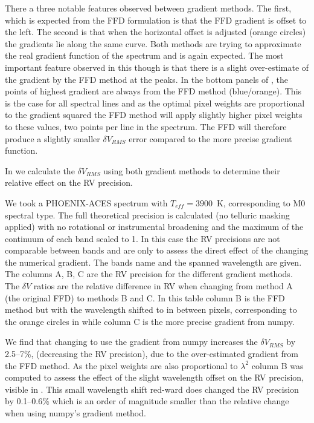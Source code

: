 There a three notable features observed between gradient methods. The first, which is expected from the FFD formulation is that the FFD gradient is offset to the left. The second is that when the horizontal offset is adjusted (orange circles) the gradients lie along the same curve. Both methods are trying to approximate the real gradient function of the spectrum and is again expected.
The most important feature observed in this though is that there is a slight over-estimate of the gradient by the FFD method at the peaks. In the bottom panels of , the points of highest gradient are always from the FFD method (blue/orange). This is the case for all spectral lines and as the optimal pixel weights are proportional to the gradient squared the FFD method will apply slightly higher pixel weights to these values, two points per line in the spectrum. The FFD will therefore produce a slightly smaller \(\delta V_{RMS}\) error compared to the more precise gradient function.

In  we calculate the  \(\delta V_{RMS}\) using both gradient methods to determine their relative effect on the RV precision.

We took a PHOENIX-ACES spectrum with \(T_{eff}=3900\)~K, corresponding to M0 spectral type. The full theoretical precision is calculated (no telluric masking applied) with no rotational or instrumental broadening and the maximum of the continuum of each band scaled to 1. In this case the RV precisions are not comparable between bands and are only to assess the direct effect of the changing the numerical gradient. The bands name and the spanned wavelength are given. The columns A, B, C are the RV precision for the different gradient methods. The \(\delta V\) ratios are the relative difference in RV when changing from method A (the original FFD) to methods B and C. In this table column B is the FFD method but with the wavelength shifted to in between pixels, corresponding to the orange circles in  while column C is the more precise gradient from numpy.

We find that changing to use the gradient from numpy increases the \(\delta V_{RMS}\) by 2.5--7\%, (decreasing the RV precision), due to the over-estimated gradient from the FFD method. As the pixel weights  are also proportional to \({\lambda}^{2}\) column B was computed to assess the effect of the slight wavelength offset on the RV precision, visible in . This small wavelength shift red-ward does changed the RV precision by 0.1--0.6\% which is an order of magnitude smaller than the relative change when using numpy's gradient method.

